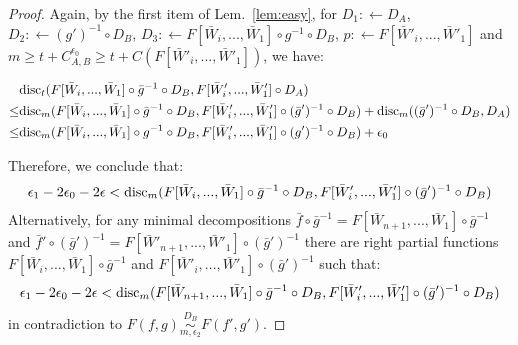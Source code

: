 \documentclass{article} %
\newcommand{\disc}{\textnormal{disc}}
\begin{document}
\begin{proof}
Again, by the first item of Lem.~\ref{lem:easy}, for $D_1 :\leftarrow D_A$, $D_2:\leftarrow (g')^{-1} \circ D_B$, $D_3 :\leftarrow F[\bar{W}_{i},...,\bar{W}_1] \circ g^{-1} \circ D_B$, $p:\leftarrow F[\bar{W}'_{i},...,\bar{W}'_1]$ and $m \geq t + C^{\epsilon_0}_{A,B} \geq t + C(F[\bar{W}'_{i},...,\bar{W}'_1])$, we have:
\begin{small}
\begin{equation}
\begin{aligned}
&\disc_t(F[\bar{W}_{i},...,\bar{W}_1] \circ \bar{g}^{-1} \circ D_B,F[\bar{W}'_{i},...,\bar{W}'_1] \circ D_A) \\
\leq& \disc_m(F[\bar{W}_{i},...,\bar{W}_1] \circ \bar{g}^{-1} \circ D_B,F[\bar{W}'_{i},...,\bar{W}'_1] \circ (\bar{g}')^{-1} \circ D_B) + \disc_m((\bar{g}')^{-1} \circ D_B,D_A) \\
\leq& \disc_m(F[\bar{W}_{i},...,\bar{W}_1] \circ g^{-1} \circ D_B,F[\bar{W}'_{i},...,\bar{W}'_1] \circ (g')^{-1} \circ D_B) +\epsilon_0\\
\end{aligned}
\end{equation}
\end{small}
Therefore, we conclude that:
\begin{equation}
\begin{aligned}
\epsilon_1 - 2\epsilon_0 - 2\epsilon < \disc_m(F[\bar{W}_{i},...,\bar{W}_1] \circ \bar{g}^{-1} \circ D_B,F[\bar{W}'_{i},...,\bar{W}'_1] \circ (\bar{g}')^{-1} \circ D_B)
\end{aligned}
\end{equation}
Alternatively, for any minimal decompositions $\bar{f} \circ \bar{g}^{-1} = F[\bar{W}_{n+1},...,\bar{W}_1] \circ \bar{g}^{-1}$ and $\bar{f}' \circ (\bar{g}')^{-1} = F[\bar{W}'_{n+1},...,\bar{W}'_1] \circ (\bar{g}')^{-1}$ there are right partial functions $F[\bar{W}_{i},...,\bar{W}_1] \circ \bar{g}^{-1}$ and $F[\bar{W}'_{i},...,\bar{W}'_1] \circ (\bar{g}')^{-1}$ such that:
\begin{equation}
\begin{aligned}
\epsilon_1 - 2\epsilon_0 - 2\epsilon < \disc_m(F[\bar{W}_{n+1},...,\bar{W}_1] \circ \bar{g}^{-1} \circ D_B,F[\bar{W}'_{i},...,\bar{W}'_1] \circ (\bar{g}')^{-1} \circ D_B)
\end{aligned}
\end{equation}
in contradiction to $F(f,g) \overset{D_B}{\underset{m,\epsilon_2}{\sim}}  F(f',g')$. 


\end{proof}
\end{document}
